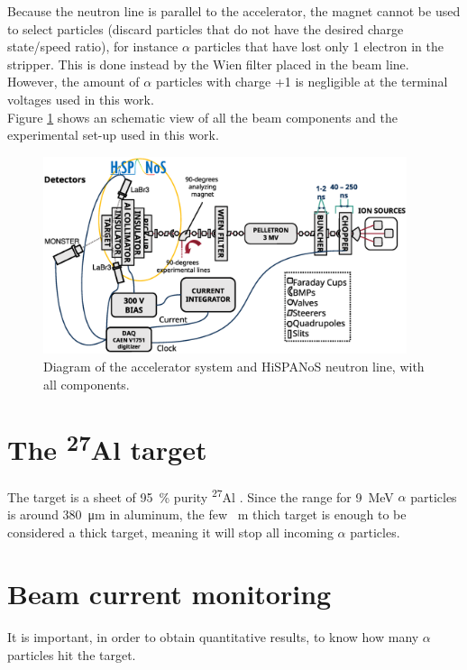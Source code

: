 \documentclass[a4paper,12pt]{report}
\newcommand{\Aliso}{\textsuperscript{27}Al }
\begin{document}
Because the neutron line is parallel to the accelerator, the magnet cannot be used to select particles (discard particles that do not have the desired charge state/speed ratio), for instance $\alpha$ particles that have lost only 1 electron in the stripper.
This is done instead by the Wien filter placed in the beam line.
However, the amount of $\alpha$ particles with charge +1 is negligible at the terminal voltages used in this work.
\\

Figure \ref{tandemdiagrama} shows an schematic view of all the beam components and the experimental set-up used in this work.

\begin{figure}[H]
	\centering
	\includegraphics[width=0.95\textwidth]{tandemdiagrama.eps}
	\caption{Diagram of the accelerator system and HiSPANoS neutron line, with all components.}
	\label{tandemdiagrama}
\end{figure}

\section{The \Aliso target}
The target is a sheet of \qty{95}{\percent} purity \Aliso.
Since the range for 9~MeV $\alpha$ particles is around \qty{380}{\micro\m} in aluminum, the few \unit{\mili\m} thich target is enough to be considered a thick target, meaning it will stop all incoming $\alpha$ particles.
\\

\section{Beam current monitoring}
It is important, in order to obtain quantitative results, to know how many $\alpha$ particles hit the target.
\end{document}
